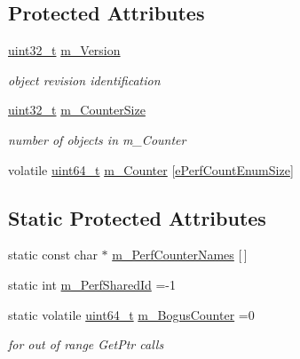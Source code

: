 \subsection*{Protected Attributes}
\begin{DoxyCompactItemize}
\item 
\hyperlink{stdint_8h_a435d1572bf3f880d55459d9805097f62}{uint32\+\_\+t} \hyperlink{structleveldb_1_1_performance_counters_a4482b82212c3ce6245d0417f815fa745}{m\+\_\+\+Version}
\begin{DoxyCompactList}\small\item\em object revision identification \end{DoxyCompactList}\item 
\hyperlink{stdint_8h_a435d1572bf3f880d55459d9805097f62}{uint32\+\_\+t} \hyperlink{structleveldb_1_1_performance_counters_a5fdfce977509e1db9812982560b90f23}{m\+\_\+\+Counter\+Size}
\begin{DoxyCompactList}\small\item\em number of objects in m\+\_\+\+Counter \end{DoxyCompactList}\item 
volatile \hyperlink{stdint_8h_aaa5d1cd013383c889537491c3cfd9aad}{uint64\+\_\+t} \hyperlink{structleveldb_1_1_performance_counters_a0674c387ef731dc72ceb65c5f6b396b1}{m\+\_\+\+Counter} \mbox{[}\hyperlink{namespaceleveldb_a0ba185501d4b24cf13090cf641fc637aa6649887b8bf40c6d506db355a53cd090}{e\+Perf\+Count\+Enum\+Size}\mbox{]}
\end{DoxyCompactItemize}
\subsection*{Static Protected Attributes}
\begin{DoxyCompactItemize}
\item 
static const char $\ast$ \hyperlink{structleveldb_1_1_performance_counters_a0d494602f6e67dd9a869e952aad5d927}{m\+\_\+\+Perf\+Counter\+Names} \mbox{[}$\,$\mbox{]}
\item 
static int \hyperlink{structleveldb_1_1_performance_counters_a67299bcd8e76cd7c71331423b4bfbc7f}{m\+\_\+\+Perf\+Shared\+Id} =-\/1
\item 
static volatile \hyperlink{stdint_8h_aaa5d1cd013383c889537491c3cfd9aad}{uint64\+\_\+t} \hyperlink{structleveldb_1_1_performance_counters_ab503614d92ee897bdbded0c210ef9c14}{m\+\_\+\+Bogus\+Counter} =0
\begin{DoxyCompactList}\small\item\em for out of range Get\+Ptr calls \end{DoxyCompactList}\end{DoxyCompactItemize}


